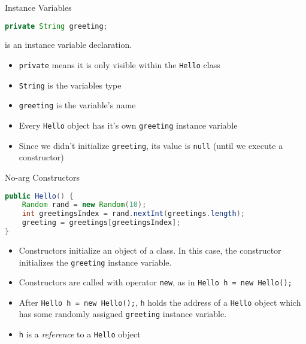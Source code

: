 \documentclass{beamer}
\begin{document}
\begin{frame}[fragile]{Instance Variables}


\begin{lstlisting}[language=Java]
  private String greeting;
\end{lstlisting}
is an instance variable declaration.
\begin{itemize}
\item {\tt private} means it is only visible within the {\tt Hello} class
\item {\tt String} is the variables type
\item {\tt greeting} is the variable's name
\item Every {\tt Hello} object has it's own {\tt greeting} instance variable
\item Since we didn't initialize {\tt greeting}, its value is {\tt null} (until we execute a constructor)
\end{itemize}


\end{frame}

\begin{frame}[fragile]{No-arg Constructors}


\begin{lstlisting}[language=Java]
public Hello() {
    Random rand = new Random(10);
    int greetingsIndex = rand.nextInt(greetings.length);
    greeting = greetings[greetingsIndex];
}
\end{lstlisting}

\begin{itemize}
\item Constructors initialize an object of a class.  In this case, the constructor initializes the {\tt greeting} instance variable.
\item Constructors are called with operator {\tt new}, as in {\tt Hello h = new Hello();}
\item After {\tt Hello h = new Hello();}, {\tt h} holds the address of a {\tt Hello} object which has some randomly assigned {\tt greeting} instance variable.
\item {\tt h} is a {\it reference} to a {\tt Hello} object
\end{itemize}


\end{frame}
\end{document}

